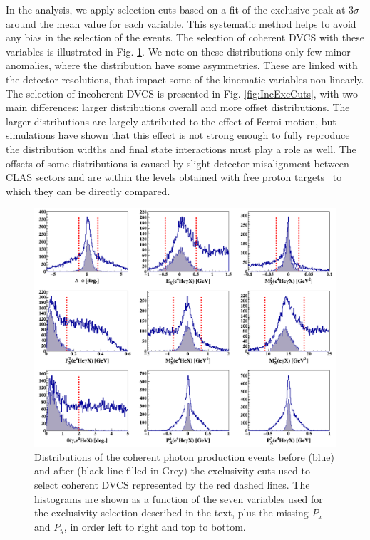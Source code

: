\documentclass{article}
\begin{document}
In the analysis, we apply selection cuts based on a fit of the exclusive peak at 3$\sigma$ around 
the mean value for each variable. This systematic method helps to avoid any bias 
in the selection of the events. The selection of coherent DVCS with these variables is illustrated in 
Fig. \ref{fig:CohExcCuts}. We note on these distributions only few minor anomalies, where the 
distribution have some asymmetries. These are linked with the detector resolutions, that impact
some of the kinematic variables non linearly. The selection of incoherent DVCS is presented in 
Fig. \ref{fig:IncExcCuts}, with two main differences: larger distributions overall and more
offset distributions. The larger distributions are largely attributed to the effect of 
Fermi motion, but simulations have shown that this effect is not strong enough to fully 
reproduce the distribution widths and final state interactions must play a role as well. 
The offsets of some distributions is caused by slight detector 
misalignment between CLAS sectors and are within the levels obtained with free proton 
targets~\cite{HirlingerSaylor:2018bnu} to which they can be directly compared. 

\begin{figure}[tbp!]
\center
\includegraphics[trim=10 10 10 5,clip,width=16.5cm]{fig3/all_coh_exc_cuts.png}
        \caption{Distributions of the coherent photon production events before 
        (blue) and after (black line filled
	in Grey) the exclusivity cuts used to select coherent DVCS represented by the 
	red dashed lines. The histograms are shown as a function of the 
	seven variables used for the exclusivity selection described in the text, 
	plus the missing $P_x$ and $P_y$, in order left to right and top to bottom. 
	}
\label{fig:CohExcCuts}
\end{figure}
\end{document}
